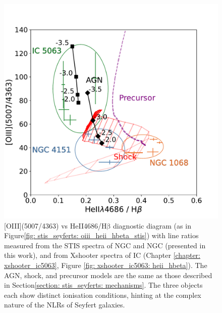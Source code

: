 \begin{figure}[!t]
\centering
    \includegraphics[width=0.8\linewidth]{figures/stis_seyferts/oiii_heii_hb_seyferts.pdf}
    \caption[HeII$\lambda$4686/H$\mathrm{\beta}$ vs {[}OIII{]}5007/{[}OIII{]}$\lambda$4363 diagnostic diagram for the warm ionised gas in IC, NGC and NGC, including modelled values for (radiation-bounded and matter-bounded) photo- and shock-ionised gas.]{[OIII](5007/4363) vs HeII4686/H$\mathrm{\beta}$ diagnostic diagram (as in Figure\;\ref{fig: stis_seyferts: oiii_heii_hbeta_stis}) with line ratios measured from the STIS spectra of NGC and NGC (presented in this work), and from Xshooter spectra of IC (Chapter \ref{chapter: xshooter_ic5063}, Figure \ref{fig: xshooter_ic5063: heii_hbeta}). The AGN, shock, and precursor models are the same as those described in Section\;\ref{section: stis_seyferts: mechanisms}. The three objects each show distinct ionisation conditions, hinting at the complex nature of the NLRs of Seyfert galaxies.}
    \label{fig: stis_seyferts: oiii_heii_hb_seyferts}
\end{figure}

